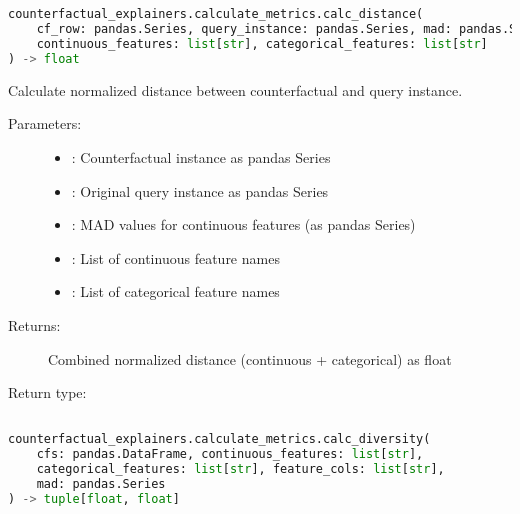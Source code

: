 \subsection{}
\label{func:calc_distance}

\begin{lstlisting}[language=Python, caption={Function Signature}]
counterfactual_explainers.calculate_metrics.calc_distance(
    cf_row: pandas.Series, query_instance: pandas.Series, mad: pandas.Series,
    continuous_features: list[str], categorical_features: list[str]
) -> float
\end{lstlisting}

Calculate normalized distance between counterfactual and query instance.

\begin{description}
    \item[Parameters:]
        \begin{itemize}
            \item {}: Counterfactual instance as pandas Series
            \item {}: Original query instance as pandas Series
            \item {}: MAD values for continuous features (as pandas Series)
            \item {}: List of continuous feature names
            \item {}: List of categorical feature names
        \end{itemize}
    \item[Returns:] Combined normalized distance (continuous + categorical) as float
    \item[Return type:] 
\end{description}


\subsection{}
\label{func:calc_diversity}

\begin{lstlisting}[language=Python, caption={Function Signature}]
counterfactual_explainers.calculate_metrics.calc_diversity(
    cfs: pandas.DataFrame, continuous_features: list[str],
    categorical_features: list[str], feature_cols: list[str],
    mad: pandas.Series
) -> tuple[float, float]
\end{lstlisting}

